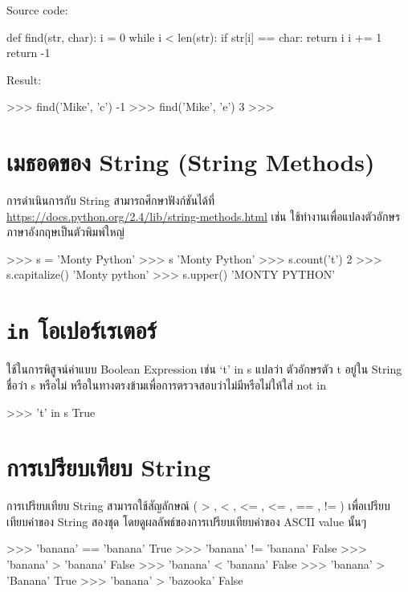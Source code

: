 Source code:
\begin{codelist}{}{}
def find(str, char):
    i = 0
    while i < len(str):
       if str[i] == char: return i
       i += 1
    return -1
\end{codelist}

Result:
\begin{codelist}{}{}
>>> find('Mike', 'c')
-1
>>> find('Mike', 'e')
3
>>>
\end{codelist}



\section{เมธอดของ String (String Methods)}

การดำเนินการกับ String สามารถศึกษาฟังก์ชันได้ที่ \url{https://docs.python.org/2.4/lib/string-methods.html} เช่น   ใช้ทำงานเพื่อแปลงตัวอักษรภาษาอังกฤษเป็นตัวพิมพ์ใหญ่

\begin{codelist}{}{}
>>> s = 'Monty Python'
>>> s
'Monty Python'
>>> s.count('t')
2
>>> s.capitalize()
'Monty python'
>>> s.upper()
'MONTY PYTHON'

\end{codelist}


\section{\texttt{in} โอเปอร์เรเตอร์}

ใช้ในการพิสูจน์ค่าแบบ Boolean Expression เช่น ‘t’ in s แปลว่า ตัวอักษรตัว t อยู่ใน String ชื่อว่า s หรือไม่ หรือในทางตรงข้ามเพื่อการตรวจสอบว่าไม่มีหรือไม่ให้ใส่ not in 

\begin{codelist}{}{}
>>> 't' in s
True
\end{codelist}

\section{การเปรียบเทียบ String}

การเปรียบเทียบ String สามารถใช้สัญลักษณ์  ( > , < , <= , <= , == , !=  ) เพื่อเปรียบเทียบค่าของ String สองชุด โดยดูผลลัพธ์ของการเปรียบเทียบค่าของ ASCII value นั้นๆ

\begin{codelist}{}{}
>>> 'banana' == 'banana'
True
>>> 'banana' !=  'banana'
False
>>>  'banana' >  'banana'
False
>>>  'banana' <  'banana'
False
>>>  'banana' >  'Banana'
True
>>>  'banana' >  'bazooka'
False
\end{codelist}


